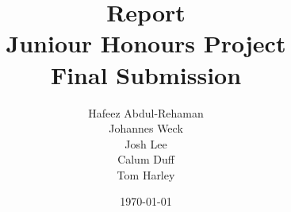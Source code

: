 \title{Report \\ Juniour Honours Project \\[0.5ex] Final Submission}
\author{Hafeez Abdul-Rehaman \\[1ex] Johannes Weck \\[1ex] Josh Lee \\[1ex] Calum Duff \\[2ex] Tom Harley}
\date{\today}

\makeatletter
	\def\@maketitle{
		\begin{center}
			\texttt{[image: title-logo]}\\[10ex]
			{\huge \bfseries \@title{ }}\\[1ex]
			\rule{0.5\textwidth}{.4pt}\\[1ex]
			{\LARGE \@author}\\[15ex]
			{\large \@date}
		\end{center}
	}
\makeatother
